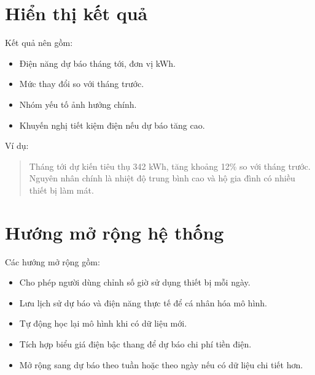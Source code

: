 \section{Hiển thị kết quả}

Kết quả nên gồm:

\begin{itemize}[leftmargin=1.2cm]
  \item Điện năng dự báo tháng tới, đơn vị kWh.
  \item Mức thay đổi so với tháng trước.
  \item Nhóm yếu tố ảnh hưởng chính.
  \item Khuyến nghị tiết kiệm điện nếu dự báo tăng cao.
\end{itemize}

Ví dụ:

\begin{quote}
Tháng tới dự kiến tiêu thụ 342 kWh, tăng khoảng 12\% so với tháng trước. Nguyên nhân chính là nhiệt độ trung bình cao và hộ gia đình có nhiều thiết bị làm mát.
\end{quote}

\section{Hướng mở rộng hệ thống}

Các hướng mở rộng gồm:

\begin{itemize}[leftmargin=1.2cm]
  \item Cho phép người dùng chỉnh số giờ sử dụng thiết bị mỗi ngày.
  \item Lưu lịch sử dự báo và điện năng thực tế để cá nhân hóa mô hình.
  \item Tự động học lại mô hình khi có dữ liệu mới.
  \item Tích hợp biểu giá điện bậc thang để dự báo chi phí tiền điện.
  \item Mở rộng sang dự báo theo tuần hoặc theo ngày nếu có dữ liệu chi tiết hơn.
\end{itemize}
